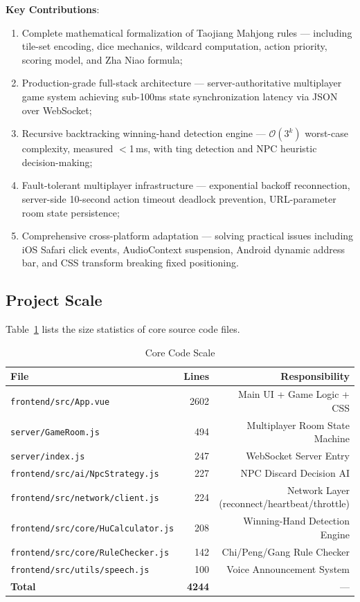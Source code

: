 \documentclass[11pt,a4paper]{article}
\begin{document}
\textbf{Key Contributions}:
\begin{enumerate}[nosep]
  \item Complete mathematical formalization of Taojiang Mahjong rules — including tile-set encoding, dice mechanics, wildcard computation, action priority, scoring model, and Zha Niao formula;
  \item Production-grade full-stack architecture — server-authoritative multiplayer game system achieving sub-100ms state synchronization latency via JSON over WebSocket;
  \item Recursive backtracking winning-hand detection engine — $\mathcal{O}(3^k)$ worst-case complexity, measured $<$1\,ms, with ting detection and NPC heuristic decision-making;
  \item Fault-tolerant multiplayer infrastructure — exponential backoff reconnection, server-side 10-second action timeout deadlock prevention, URL-parameter room state persistence;
  \item Comprehensive cross-platform adaptation — solving practical issues including iOS Safari click events, AudioContext suspension, Android dynamic address bar, and CSS transform breaking fixed positioning.
\end{enumerate}

\subsection{Project Scale}

Table~\ref{tab:scale} lists the size statistics of core source code files.

\begin{table}[H]
\centering
\caption{Core Code Scale}
\label{tab:scale}
\small
\begin{tabular}{@{}lrr@{}}
\toprule
\textbf{File} & \textbf{Lines} & \textbf{Responsibility} \\
\midrule
\texttt{frontend/src/App.vue} & 2602 & Main UI + Game Logic + CSS \\
\texttt{server/GameRoom.js} & 494 & Multiplayer Room State Machine \\
\texttt{server/index.js} & 247 & WebSocket Server Entry \\
\texttt{frontend/src/ai/NpcStrategy.js} & 227 & NPC Discard Decision AI \\
\texttt{frontend/src/network/client.js} & 224 & Network Layer (reconnect/heartbeat/throttle) \\
\texttt{frontend/src/core/HuCalculator.js} & 208 & Winning-Hand Detection Engine \\
\texttt{frontend/src/core/RuleChecker.js} & 142 & Chi/Peng/Gang Rule Checker \\
\texttt{frontend/src/utils/speech.js} & 100 & Voice Announcement System \\
\midrule
\textbf{Total} & \textbf{4244} & — \\
\bottomrule
\end{tabular}
\end{table}
\end{document}
